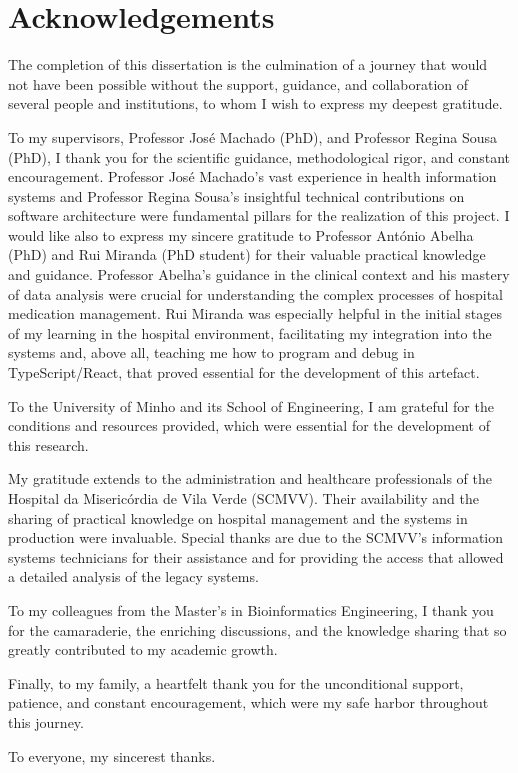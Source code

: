 \chapter*{Acknowledgements}

The completion of this dissertation is the culmination of a journey that would not have been possible without the support, guidance, and collaboration of several people and institutions, to whom I wish to express my deepest gratitude.

To my supervisors, Professor José Machado (PhD), and Professor Regina Sousa (PhD), I thank you for the scientific guidance, methodological rigor, and constant encouragement. Professor José Machado's vast experience in health information systems and Professor Regina Sousa's insightful technical contributions on software architecture were fundamental pillars for the realization of this project. I would like also to express my sincere gratitude to Professor António Abelha (PhD) and Rui Miranda (PhD student) for their valuable practical knowledge and guidance. Professor Abelha’s guidance in the clinical context and his mastery of data analysis were crucial for understanding the complex processes of hospital medication management. Rui Miranda was especially helpful in the initial stages of my learning in the hospital environment, facilitating my integration into the systems and, above all, teaching me how to program and debug in TypeScript/React, that proved essential for the development of this artefact.

To the University of Minho and its School of Engineering, I am grateful for the conditions and resources provided, which were essential for the development of this research.

My gratitude extends to the administration and healthcare professionals of the Hospital da Misericórdia de Vila Verde (SCMVV). Their availability and the sharing of practical knowledge on hospital management and the systems in production were invaluable. Special thanks are due to the SCMVV's information systems technicians for their assistance and for providing the access that allowed a detailed analysis of the legacy systems.

To my colleagues from the Master's in Bioinformatics Engineering, I thank you for the camaraderie, the enriching discussions, and the knowledge sharing that so greatly contributed to my academic growth.

Finally, to my family, a heartfelt thank you for the unconditional support, patience, and constant encouragement, which were my safe harbor throughout this journey.

To everyone, my sincerest thanks.

\cleardoublepage 